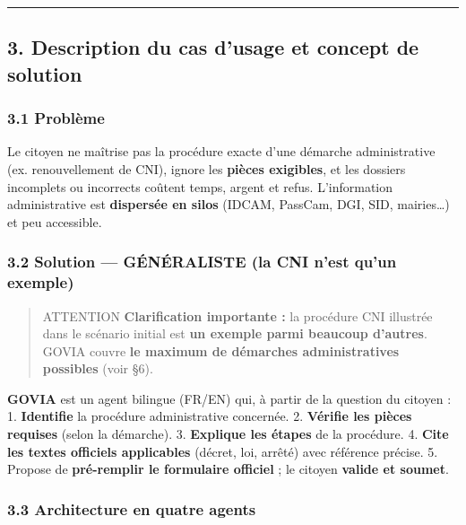 \documentclass[
]{article}
\begin{document}
\begin{center}\rule{0.5\linewidth}{0.5pt}\end{center}

\subsection{3. Description du cas d'usage et concept de
solution}\label{description-du-cas-dusage-et-concept-de-solution}

\subsubsection{3.1 Problème}\label{probluxe8me}

Le citoyen ne maîtrise pas la procédure exacte d'une démarche
administrative (ex. renouvellement de CNI), ignore les \textbf{pièces
exigibles}, et les dossiers incomplets ou incorrects coûtent temps,
argent et refus. L'information administrative est \textbf{dispersée en
silos} (IDCAM, PassCam, DGI, SID, mairies\ldots) et peu accessible.

\subsubsection{3.2 Solution --- GÉNÉRALISTE (la CNI n'est qu'un
exemple)}\label{solution-guxe9nuxe9raliste-la-cni-nest-quun-exemple}

\begin{quote}
ATTENTION \textbf{Clarification importante :} la procédure CNI illustrée
dans le scénario initial est \textbf{un exemple parmi beaucoup
d'autres}. GOVIA couvre \textbf{le maximum de démarches administratives
possibles} (voir §6).
\end{quote}

\textbf{GOVIA} est un agent bilingue (FR/EN) qui, à partir de la
question du citoyen : 1. \textbf{Identifie} la procédure administrative
concernée. 2. \textbf{Vérifie les pièces requises} (selon la démarche).
3. \textbf{Explique les étapes} de la procédure. 4. \textbf{Cite les
textes officiels applicables} (décret, loi, arrêté) avec référence
précise. 5. Propose de \textbf{pré-remplir le formulaire officiel} ; le
citoyen \textbf{valide et soumet}.

\subsubsection{3.3 Architecture en quatre
agents}\label{architecture-en-quatre-agents}
\end{document}
